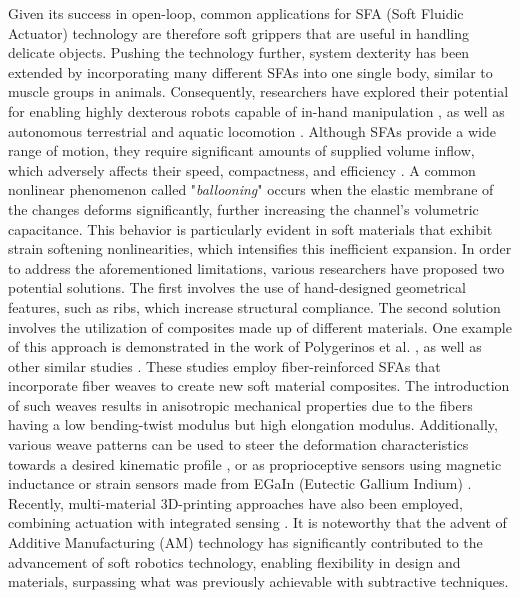 Given its success in open-loop, common applications for SFA (Soft Fluidic Actuator) technology are therefore soft grippers \cite{Galloway2016, Hughes2016Nov, Ansari2022Sep, Teleshev1981, Sinatra2019Aug} that are useful in handling delicate objects. Pushing the technology further, system dexterity has been extended by incorporating many different SFAs into one single body, similar to muscle groups in animals. Consequently, researchers have explored their potential for enabling highly dexterous robots capable of in-hand manipulation \cite{Suzumori1991, Graule2022}, as well as autonomous terrestrial and aquatic locomotion \cite{Choi2011, Katzschmann2018, Drotman2017, Suzumori1992}. Although SFAs provide a wide range of motion, they require significant amounts of supplied volume inflow, which adversely affects their speed, compactness, and efficiency \cite{Overvelde2015Sep, Rus2015, Xavier2022Jun}. A common nonlinear phenomenon called "\emph{ballooning}" occurs when the elastic membrane of the changes deforms significantly, further increasing the channel's volumetric capacitance. This behavior is particularly evident in soft materials that exhibit strain softening nonlinearities, which intensifies this inefficient expansion. In order to address the aforementioned limitations, various researchers have proposed two potential solutions. The first involves the use of hand-designed geometrical features, such as ribs, which increase structural compliance. The second solution involves the utilization of composites made up of different materials. One example of this approach is demonstrated in the work of Polygerinos et al. \cite{Polygerinos2015, Polygerinos2013}, as well as other similar studies \cite{Fras2018Oct, Suzumori1991, Cianchetti2013Nov}. These studies employ fiber-reinforced SFAs that incorporate fiber weaves to create new soft material composites. The introduction of such weaves results in anisotropic mechanical properties due to the fibers having a low bending-twist modulus but high elongation modulus. Additionally, various weave patterns can be used to steer the deformation characteristics towards a desired kinematic profile \cite{Kim2019Aug, Connolly2017Jan}, or as proprioceptive sensors using magnetic inductance \cite{Felt2019Feb, Felt2015Oct} or strain sensors made from EGaIn (Eutectic Gallium Indium) \cite{Park2012,Tapia2020}. Recently, multi-material 3D-printing approaches have also been employed, combining actuation with integrated sensing \cite{Wolterink2022Oct, Zhou2021Apr}. It is noteworthy that the advent of Additive Manufacturing (AM) technology has significantly contributed to the advancement of soft robotics technology, enabling flexibility in design and materials, surpassing what was previously achievable with subtractive techniques.

